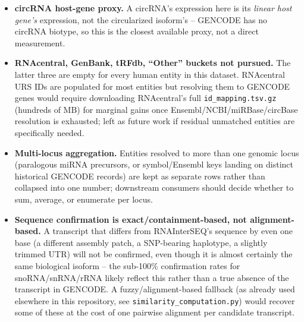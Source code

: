 \documentclass[11pt]{article}
\begin{document}
\begin{sloppypar}
\begin{itemize}
  \item \textbf{circRNA host-gene proxy.} A circRNA's expression here is its
        \emph{linear host gene's} expression, not the circularized isoform's
        -- GENCODE has no circRNA biotype, so this is the closest available
        proxy, not a direct measurement.
  \item \textbf{RNAcentral, GenBank, tRFdb, ``Other'' buckets not pursued.}
        The latter three are empty for every human entity in this dataset.
        RNAcentral URS IDs are populated for most entities but resolving them
        to GENCODE genes would require downloading RNAcentral's full
        \texttt{id\_mapping.tsv.gz} (hundreds of MB) for marginal gains once
        Ensembl/NCBI/miRBase/circBase resolution is exhausted; left as future
        work if residual unmatched entities are specifically needed.
  \item \textbf{Multi-locus aggregation.} Entities resolved to more than one
        genomic locus (paralogous miRNA precursors, or symbol/Ensembl keys
        landing on distinct historical GENCODE records) are kept as separate
        rows rather than collapsed into one number; downstream consumers
        should decide whether to sum, average, or enumerate per locus.
  \item \textbf{Sequence confirmation is exact/containment-based, not
        alignment-based.} A transcript that differs from RNAInterSEQ's
        sequence by even one base (a different assembly patch, a SNP-bearing
        haplotype, a slightly trimmed UTR) will not be confirmed, even though
        it is almost certainly the same biological isoform -- the
        sub-100\% confirmation rates for snoRNA/snRNA/rRNA likely reflect
        this rather than a true absence of the transcript in GENCODE. A
        fuzzy/alignment-based fallback (as already used elsewhere in this
        repository, see \texttt{similarity\_computation.py}) would recover
        some of these at the cost of one pairwise alignment per candidate
        transcript.
\end{itemize}
\end{sloppypar}
\end{document}
